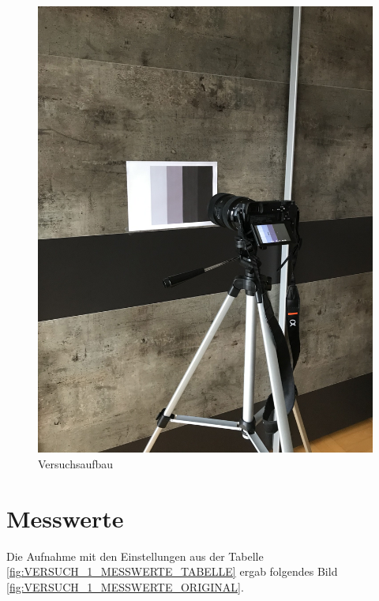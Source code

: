 \documentclass[12pt, oneside, a4paper, \docLanguage]{report}
\begin{document}
\begin{figure}[H]
	\centering\small
	\includegraphics[width=\textwidth, angle=-90, scale=0.8]{media/Versuchsaufbau_Grauwertkeil}
	\caption{Versuchsaufbau}
	\label{fig:VERSUCH_1_AUFBAU}
\end{figure}
\newpage
\section{Messwerte}
\label{chap:VERSUCH_1_MESSWERTE}
Die Aufnahme mit den Einstellungen aus der Tabelle \ref{fig:VERSUCH_1_MESSWERTE_TABELLE} ergab folgendes Bild \ref{fig:VERSUCH_1_MESSWERTE_ORIGINAL}.
\end{document}
